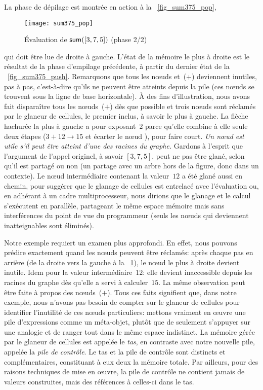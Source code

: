 La phase de dépilage est montrée en action à la \fig~\vref{fig_sum375_pop},
\begin{figure}[b]
\centering
\texttt{[image: sum375\_pop]}
\caption{Évaluation de \(\textsf{sum}([3,7,5])\) (phase 2/2)
\label{fig_sum375_pop}}
\end{figure}
qui doit être lue de droite à gauche. L'état de la mémoire le plus à
droite est le résultat de la phase d'empilage précédente, à partir du
dernier état de la \fig~\ref{fig_sum375_push}. Remarquons que tous les
n{\oe}uds  et~(\(+\)) deviennent inutiles, pas à pas,
c'est-à-dire qu'ils ne peuvent être atteints depuis la pile (ces
n{\oe}uds se trouvent sous la ligne de base horizontale). À des fins
d'illustration, nous avons fait disparaître tous les n{\oe}uds~(\(+\))
dès que possible et trois n{\oe}uds  sont réclamés par le
glaneur de cellules, le premier inclus, à savoir le plus à gauche. La
flèche hachurée la plus à gauche a pour exposant~\(2\) parce qu'elle
combine à elle seule deux étapes (\(3+12 \rightarrow 15\) et écarter
le n{\oe}ud ), pour faire court. \emph{Un n{\oe}ud est utile
  s'il peut être atteint d'une des racines du graphe.} Gardons à
l'esprit que l'argument de l'appel originel, à savoir \([3,7,5]\),
peut ne pas être glané, selon qu'il est partagé ou non (un partage
avec un arbre hors de la figure, donc dans un contexte). Le n{\oe}ud
intermédiaire contenant la valeur~\(12\) a été glané aussi en chemin,
pour suggérer que le glanage de cellules est entrelacé avec
l'évaluation ou, en adhérant à un cadre multiprocesseur, nous dirions
que le glanage et le calcul s'exécutent en parallèle, partageant le
même espace mémoire mais sans interférences du point de vue du
programmeur (seuls les n{\oe}uds qui deviennent inatteignables sont
éliminés).

Notre exemple requiert un examen plus approfondi. En effet, nous
pouvons prédire exactement quand les n{\oe}uds  peuvent être
réclamés: après chaque pas en arrière (de la droite vers la gauche à
la \fig~\ref{fig_sum375_pop}), le n{\oe}ud  le plus à droite
devient inutile. Idem pour la valeur intermédiaire~\(12\): elle
devient inaccessible depuis les racines du graphe dès qu'elle a servi
à calculer~\(15\). La même observation peut être faite à propos des
n{\oe}uds~(\(+\)). Tous ces faits signifient que, dans notre exemple,
nous n'avons pas besoin de compter sur le glaneur de cellules pour
identifier l'inutilité de ces n{\oe}uds particuliers: mettons vraiment
en {\oe}uvre une pile d'expressions comme un méta-objet, plutôt que de
seulement s'appuyer sur une analogie et de ranger tout dans le même
espace indistinct. La mémoire gérée par le glaneur de cellules est
appelée le \emph{tas}, en contraste avec notre nouvelle pile, appelée
la \emph{pile de contrôle}. Le tas et la pile de contrôle sont
distincts et complémentaires, constituant à eux deux la mémoire
totale. Par ailleurs, pour des raisons techniques de mise en
{\oe}uvre, la pile de contrôle ne contient jamais de valeurs
construites, mais des références à celles-ci dans le tas.

